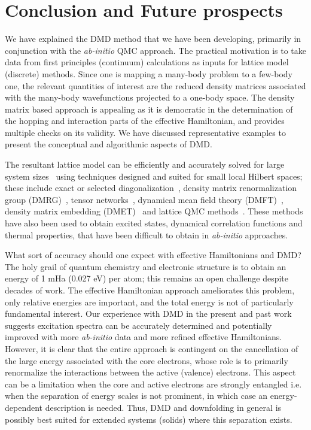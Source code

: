 \section{Conclusion and Future prospects}
We have explained the DMD method that we have been developing, primarily in conjunction with the 
\textit{ab-initio} QMC approach. The practical motivation is to take data from first principles (continuum) 
calculations as inputs for lattice model (discrete) methods. 
Since one is mapping a many-body problem to a few-body one, the relevant quantities of interest are 
the reduced density matrices associated with the many-body wavefunctions projected to a one-body space. 
The density matrix based approach is appealing as it is democratic 
in the determination of the hopping and interaction parts of the effective Hamiltonian, and provides multiple 
checks on its validity. We have discussed representative examples to present the conceptual and algorithmic aspects of DMD. 

The resultant lattice model can be efficiently and accurately solved for large system sizes~\cite{LeBlanc_PRX} 
using techniques designed and suited for small local Hilbert spaces; these include exact or 
selected diagonalization~\cite{DeRaedt,Tubman_selci,Holmes_Tubman_Umrigar}, 
density matrix renormalization group (DMRG)~\cite{White1992}, tensor networks~\cite{PEPS,Changlani_CPS,NeuscammanCPS}, 
dynamical mean field theory (DMFT)~\cite{Kotliar2006}, density matrix embedding (DMET)~\cite{DMET_2012} and 
lattice QMC methods~\cite{Scalapino, Trivedi_Ceperley, Zhang_AFQMC, Sandvik_loops, Prokofiev, 
Booth2009,SQMC,Holmes_Changlani_Umrigar, Booth2013}. These methods have also been used to obtain excited states, 
dynamical correlation functions and thermal properties, that have been difficult to obtain in \textit{ab-initio} approaches. 

What sort of accuracy should one expect with effective Hamiltonians and DMD? The holy grail of quantum chemistry 
and electronic structure is to obtain an energy of 1 mHa (0.027 eV) per atom; this 
remains an open challenge despite decades of work. The effective Hamiltonian approach 
ameliorates this problem, only relative energies are important, and 
the total energy is not of particularly fundamental interest. Our experience with DMD in the present and past work~\cite{Changlani2015} 
suggests excitation spectra can be accurately determined and potentially improved with more \textit{ab-initio} data 
and more refined effective Hamiltonians. However, it is clear that the entire approach is contingent on the 
cancellation of the large energy associated with the core electrons, 
whose role is to primarily renormalize the interactions between the active (valence) electrons. 
This aspect can be a limitation when the core and active electrons are strongly entangled i.e. 
when the separation of energy scales is not prominent, in which case an energy-dependent description is needed. 
Thus, DMD and downfolding in general is possibly best suited for extended systems (solids) where this separation exists. 

